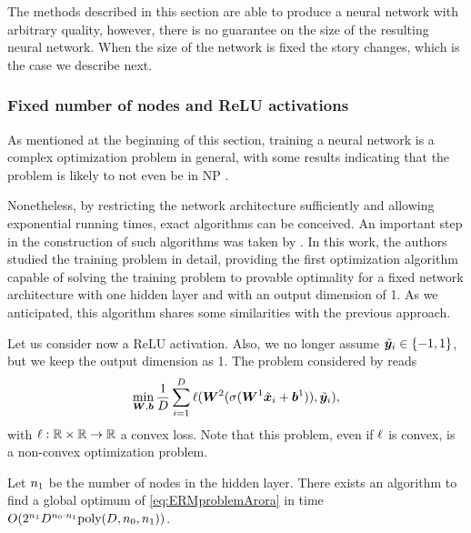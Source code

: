 The methods described in this section are able to produce a neural network with arbitrary quality, however, there is no guarantee on the size of the resulting neural network. When the size of the network is fixed the story changes, which is the case we describe next.

\subsubsection{Fixed number of nodes and ReLU activations}
\label{sec:arora}
As mentioned at the beginning of this section, training a neural network
is a complex optimization problem in general, with some results indicating that the problem is likely to not even be in NP \citep{abrahamsen2021training,bertschinger2022training}.

Nonetheless, by restricting the network architecture sufficiently and allowing exponential running times, exact algorithms can be conceived. An important step in the construction of such algorithms was taken by  \cite{arora2018understanding}. In this work, the authors studied the training problem in detail, providing the first 
optimization algorithm capable of solving the training problem to provable optimality for a fixed network architecture with one hidden layer and with an output dimension of 1. As we anticipated, this algorithm shares some similarities with the previous approach.

Let us consider now a ReLU activation. Also, we no longer assume $\tilde{{\bm{y}}}_i \in \{-1,1\}$, but we keep the output dimension as 1. The problem considered by \cite{arora2018understanding} reads
%
\begin{equation}
    \label{eq:ERMproblemArora}
    \min_{{\bm{W}},{\bm{b}}} \frac{1}{D} \sum_{i=1}^D \ell ({\bm{W}}^2(\sigma({\bm{W}}^1\tilde{{\bm{x}}}_i + {\bm{b}}^1)), \tilde{{\bm{y}}}_i),
\end{equation}
%
with $\ell: \mathbb{R} \times \mathbb{R} \to \mathbb{R}$ a convex loss. Note that this problem, even if $\ell$ is convex, is a non-convex optimization problem.

\begin{theorem}
Let $n_1$ be the number of nodes in the hidden layer. There exists an algorithm to find a global optimum of \eqref{eq:ERMproblemArora} in time $O(2^{n_1} D^{{n_0} \cdot n_1} \text{poly}(D,{n_0},n_1))$.
\end{theorem}

